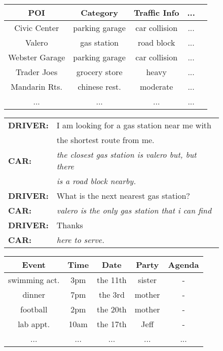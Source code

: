 \documentclass[11pt,a4paper]{article}
\begin{document}
  \begin{figure}[ht]
\small
\centering
  \begin{tabular}{|c|c|c|c|c|}
  \hline
  \bf POI& \bf Category & \bf Traffic Info& \bf ... \\ \hline
  Civic Center & parking garage & car collision & ... \\ 
  Valero & gas station  & road block  & ... \\
  Webster Garage & parking garage & car collision  & ... \\ 
  Trader Joes & grocery store & heavy & ... \\ 
  Mandarin Rts. & chinese rest. & moderate  & ... \\
  ... & ... & ... & ...  \\
  \hline
  \end{tabular}

  \vspace{3mm}

  \newcommand\D{\emph{D}}

  \begin{tabular}{ll}
    \bf DRIVER: & I am looking for a gas station near me with \\
    &  the shortest route from me.\\
    \bf CAR: & \emph{the closest gas station is valero but, but there} \\
    & \emph{is a road block nearby.} \\
    \bf DRIVER: & What is the next nearest gas station?\\ 
    \bf CAR: & \emph{valero is the only gas station that i can find}\\
    \bf DRIVER: & Thanks\\
    \bf CAR: & \emph{here to serve.}\\
  \end{tabular}

  \vspace{8mm}

\small
\centering
  \begin{tabular}{|c|c|c|c|c|}
  \hline
  \bf Event & \bf Time & \bf Date & \bf Party & \bf Agenda \\ \hline
  swimming act. & 3pm & the 11th & sister & - \\ 
  dinner & 7pm & the 3rd & mother & - \\
  football & 2pm & the 20th & mother & - \\ 
  lab appt. & 10am & the 17th & Jeff & - \\ 
  ... & ... & ... & ... & ... \\
  \hline
  \end{tabular}


\end{figure}
\end{document}
